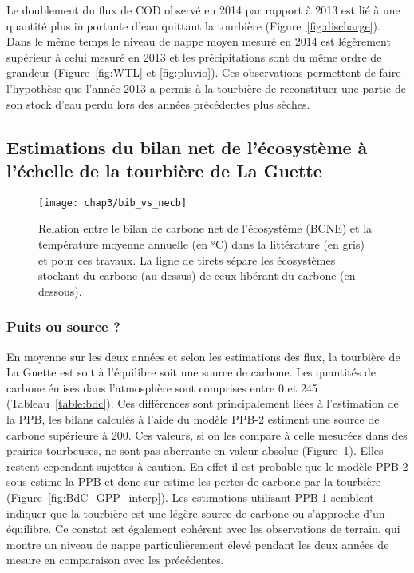 Le doublement du flux de COD observé en 2014 par rapport à 2013 est lié à une quantité plus importante d'eau quittant la tourbière (Figure~\ref{fig:discharge}).
Dans le même temps le niveau de nappe moyen mesuré en 2014 est légèrement supérieur à celui mesuré en 2013 et les précipitations sont du même ordre de grandeur (Figure~\ref{fig:WTL} et \ref{fig:pluvio}).
Ces observations permettent de faire l'hypothèse que l'année 2013 a permis à la tourbière de reconstituer une partie de son stock d'eau perdu lors des années précédentes plus sèches.

\subsection{Estimations du bilan net de l'écosystème à l'échelle de la tourbière de La Guette}

\begin{figure}
\centering
\texttt{[image: chap3/bib\_vs\_necb]}
\caption{Relation entre le bilan de carbone net de l'écosystème (BCNE) et la température moyenne annuelle (en °C) dans la littérature (en gris) et pour ces travaux. La ligne de tirets sépare les écosystèmes stockant du carbone (au dessus) de ceux libérant du carbone (en dessous).}
\label{fig:bib_vs_necb}
\end{figure}

\subsubsection{Puits ou source ?}

En moyenne sur les deux années et selon les estimations des flux, la tourbière de La Guette est soit à l'équilibre soit une source de carbone.
Les quantités de carbone émises dans l'atmosphère sont comprises entre 0 et \SI{245}{\gcma} (Tableau~\ref{table:bdc}).
Ces différences sont principalement liées à l'estimation de la PPB, les bilans calculés à l'aide du modèle PPB-2 estiment une source de carbone supérieure à \SI{200}{\gcma}.
Ces valeurs, si on les compare à celle mesurées dans des prairies tourbeuses, ne sont pas aberrante en valeur absolue (Figure~\ref{fig:bib_vs_necb}).
Elles restent cependant sujettes à caution.
En effet il est probable que le modèle PPB-2 sous-estime la PPB et donc sur-estime les pertes de carbone par la tourbière (Figure~\ref{fig:BdC_GPP_interp}).
Les estimations utilisant PPB-1 semblent indiquer que la tourbière est une légère source de carbone ou s'approche d'un équilibre.
Ce constat est également cohérent avec les observations de terrain, qui montre un niveau de nappe particulièrement élevé pendant les deux années de mesure en comparaison avec les précédentes.

